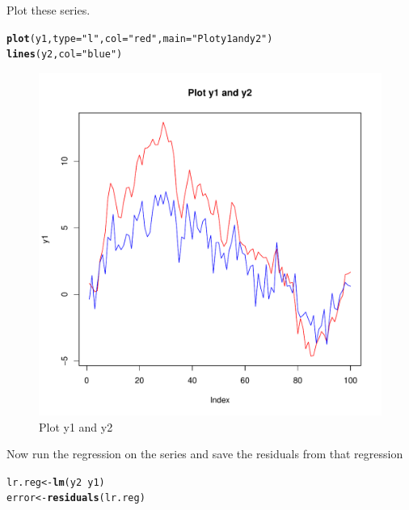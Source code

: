 \documentclass{article}\usepackage{graphicx, color}
\makeatletter
\def\maxwidth{ %
  \ifdim\Gin@nat@width>\linewidth
    \linewidth
  \else
    \Gin@nat@width
  \fi
}
\newcommand{\hlfunctioncall}[1]{\textcolor[rgb]{0.501960784313725,0,0.329411764705882}{\textbf{#1}}}%
\newcommand{\hlstring}[1]{\textcolor[rgb]{0.6,0.6,1}{#1}}%
\newenvironment{kframe}{%
 \def\at@end@of@kframe{}%
 \ifinner\ifhmode%
  \def\at@end@of@kframe{\end{minipage}}%
  \begin{minipage}{\columnwidth}%
 \fi\fi%
 \def\FrameCommand##1{\hskip\@totalleftmargin \hskip-\fboxsep
 \colorbox{shadecolor}{##1}\hskip-\fboxsep
     \hskip-\linewidth \hskip-\@totalleftmargin \hskip\columnwidth}%
 \MakeFramed {\advance\hsize-\width
   \@totalleftmargin\z@ \linewidth\hsize
   \@setminipage}}%
 {\par\unskip\endMakeFramed%
 \at@end@of@kframe}
\newenvironment{knitrout}{}{} %
\makeatother
\begin{document}
Plot these series.
\begin{knitrout}
\color{fgcolor}\begin{kframe}
\begin{alltt}
\hlfunctioncall{plot}(y1, type = \hlstring{"l"}, col = \hlstring{"red"}, main = \hlstring{"Plot y1 and y2"})
\hlfunctioncall{lines}(y2, col = \hlstring{"blue"})
\end{alltt}
\end{kframe}\begin{figure}[]

\includegraphics[width=\maxwidth]{figure/Plot-EG} \caption[Plot y1 and y2]{Plot y1 and y2\label{fig:Plot-EG}}
\end{figure}


\end{knitrout}

Now run the regression on the series and save the residuals from that regression
\begin{knitrout}
\color{fgcolor}\begin{kframe}
\begin{alltt}
lr.reg <- \hlfunctioncall{lm}(y2 ~ y1)
error <- \hlfunctioncall{residuals}(lr.reg)
\end{alltt}
\end{kframe}
\end{knitrout}
\end{document}
